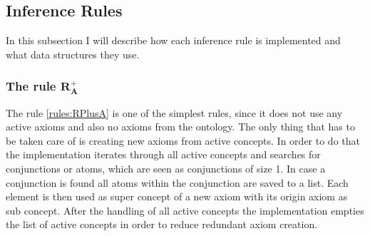 \documentclass[titlepage]{article}
\begin{document}
\subsection{Inference Rules}\label{alg:rules}
In this subsection I will describe how each inference rule is implemented and what data structures they use.

\subsubsection{The rule $\mathbf{R^{+}_A}$}
The rule \ref{rules:RPlusA} is one of the simplest rules, since it does not use any active axioms and
also no axioms from the ontology. The only thing that has to be taken care of is
creating new axioms from active concepts. In order to do that the implementation iterates
through all active concepts and searches for conjunctions or atoms, which are seen as conjunctions of size 1.
In case a conjunction is found all atoms within the conjunction are saved to a list.
Each element is then used as super concept of a new axiom with its origin axiom as sub concept.
After the handling of all active concepts the implementation empties the list of active concepts in order to
reduce redundant axiom creation.
\end{document}
